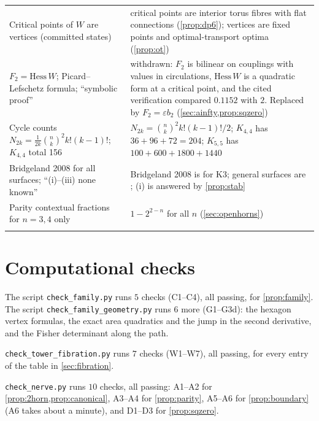 \documentclass[11pt]{article}
\theoremstyle{definition}
\theoremstyle{remark}
\begin{document}
\begin{center}
\begin{tabular}{@{}R{0.36\textwidth}R{0.56\textwidth}@{}}
Critical points of $W$ are vertices (committed states) & critical points are interior torus fibres with flat
connections (\cref{prop:dp6}); vertices are fixed points and optimal-transport optima (\cref{prop:ot})\\\addlinespace[3pt]
$F_2=\mathrm{Hess}\,W$; Picard--Lefschetz formula; ``symbolic proof'' & withdrawn: $F_2$ is bilinear on couplings
with values in circulations, $\mathrm{Hess}\,W$ is a quadratic form at a critical point, and the cited verification
compared $0.1152$ with $2$. Replaced by $F_2=\varepsilon b_2$ (\cref{sec:ainfty,prop:sqzero})\\\addlinespace[3pt]
Cycle counts $N_{2k}=\frac1{2k}\binom nk^2k!(k-1)!$; $K_{4,4}$ total 156 & $N_{2k}=\binom nk^2k!(k-1)!/2$; $K_{4,4}$ has
$36+96+72=204$; $K_{5,5}$ has $100+600+1800+1440$\\\addlinespace[3pt]
Bridgeland 2008 for all surfaces; ``(i)--(iii) none known'' & Bridgeland 2008 is for K3; general surfaces are
\cite{ArcaraBertram2013}; (i) is answered by \cref{prop:stab}\\\addlinespace[3pt]
Parity contextual fractions for $n=3,4$ only & $1-2^{2-n}$ for all $n$ (\cref{sec:openhorns})\\\addlinespace[3pt]
\bottomrule
\end{tabular}
\end{center}

\section{Computational checks}\label{app:code}

The script \texttt{check\_family.py} runs $5$ checks (C1--C4), all passing, for \cref{prop:family}. The script \texttt{check\_family\_geometry.py} runs $6$ more (G1--G3d): the hexagon vertex formulas, the exact area quadratics and the jump in the second derivative, and the Fisher determinant along the path.

\texttt{check\_tower\_fibration.py} runs $7$ checks (W1--W7), all passing, for every entry of the table in
\cref{sec:fibration}.

\texttt{check\_nerve.py} runs $10$ checks, all passing: A1--A2 for \cref{prop:2horn,prop:canonical}, A3--A4 for
\cref{prop:parity}, A5--A6 for \cref{prop:boundary} (A6 takes about a minute), and D1--D3 for
\cref{prop:sqzero}.
\end{document}
